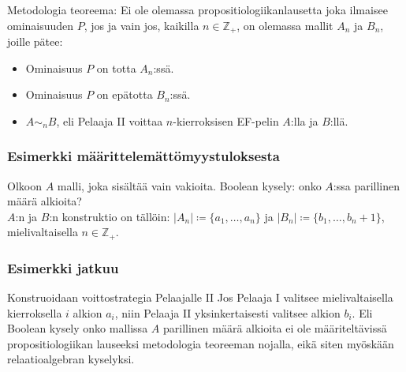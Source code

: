 \documentclass{beamer}
\begin{document}
\begin{frame}
Metodologia teoreema: Ei ole olemassa propositiologiikanlausetta joka ilmaisee ominaisuuden $P$, jos ja vain jos, kaikilla $n \in \mathbb{Z}_+$, on olemassa mallit $A_n$ ja $B_n$, joille pätee:
\begin{itemize}
\item<2-> Ominaisuus $P$ on totta $A_n$:ssä.
\item<3-> Ominaisuus $P$ on epätotta $B_n$:ssä.
\item<4-> $A \sim_n B$, eli Pelaaja II voittaa $n$-kierroksisen EF-pelin $A$:lla ja $B$:llä.
\end{itemize}
\end{frame}

\begin{frame}
\frametitle{Esimerkki määrittelemättömyystuloksesta}
Olkoon $A$ malli, joka sisältää vain vakioita. \pause Boolean kysely: onko $A$:ssa parillinen määrä alkioita? \pause \\ $A$:n ja $B$:n konstruktio on tällöin: $|A_n| \coloneqq \{a_1, \ldots, a_n\}$ ja $|B_n| \coloneqq \{b_1, \ldots, b_n+1\}$, mielivaltaisella $n \in \mathbb{Z}_+$.
\end{frame}

\begin{frame}
\frametitle{Esimerkki jatkuu}
Konstruoidaan voittostrategia Pelaajalle II \pause Jos Pelaaja I valitsee mielivaltaisella kierroksella $i$ alkion $a_i$, niin Pelaaja II yksinkertaisesti valitsee alkion $b_i$. \pause Eli Boolean kysely onko mallissa $A$ parillinen määrä alkioita ei ole määriteltävissä propositiologiikan lauseeksi metodologia teoreeman nojalla, eikä siten myöskään relaatioalgebran kyselyksi.
\end{frame}
\end{document}
